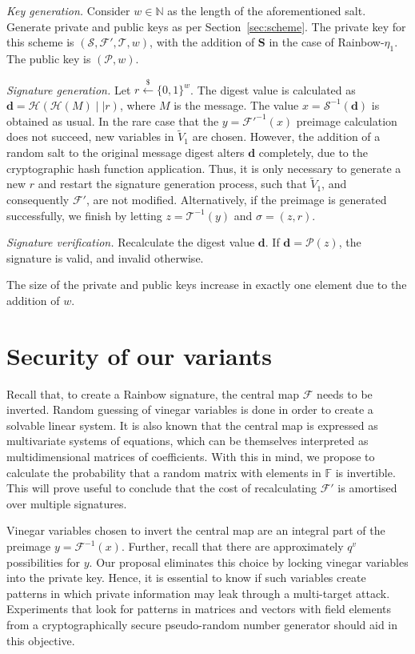\documentclass[openright, draft, 10pt]{report}
\newcommand{\random}{\stackrel{\$}{\longleftarrow}}
\begin{document}
\emph{Key generation.}
Consider $w \in \mathbb{N}$ as the length of the aforementioned salt. Generate
private and public keys as per Section~\ref{sec:scheme}. The private key
for this scheme is $(\mathcal{S}, \mathcal{F}', \mathcal{T}, w)$, with the
addition of $\mathbf{S}$ in the case of Rainbow-$\eta_{1}$. The public key is
$(\mathcal{P}, w)$.

\emph{Signature generation.}
Let $r \random{} {\{0, 1\}}^{w}$. The digest value is calculated as
$\mathbf{d} = \mathcal{H}(\mathcal{H}(M) \mid\mid r)$, where $M$ is the
message. The value $x = \mathcal{S}^{-1}(\mathbf{d})$ is obtained as usual. In
the rare case that the $y = \mathcal{F}'^{-1}(x)$ preimage calculation does not
succeed, new variables in $\widetilde{V}_{1}$ are chosen. However, the
addition of a random salt to the original message digest alters $\mathbf{d}$
completely, due to the cryptographic hash function application. Thus, it is
only necessary to generate a new $r$ and restart the signature generation
process, such that $\widetilde{V}_{1}$, and consequently $\mathcal{F}'$, are
not modified. Alternatively, if the preimage is generated successfully, we
finish by letting $z = \mathcal{T}^{-1}(y)$ and $\sigma = (z, r)$.

\emph{Signature verification.}
Recalculate the digest value $\mathbf{d}$. If $\mathbf{d} = \mathcal{P}(z)$,
the signature is valid, and invalid otherwise.

The size of the private and public keys increase in exactly one element due to
the addition of $w$.

\section{Security of our variants}\label{sec:security}

Recall that, to create a Rainbow signature, the central map $\mathcal{F}$ needs
to be inverted. Random guessing of vinegar variables is done in order to create
a solvable linear system. It is also known that the central map is expressed as
multivariate systems of equations, which can be themselves interpreted as
multidimensional matrices of coefficients. 
With this in mind, we propose to calculate the probability that a
random matrix with elements in $\mathbb{F}$ is invertible. This will prove useful
to conclude that the cost of recalculating $\mathcal{F}'$ is amortised over
multiple signatures.

Vinegar variables chosen to invert the central map are an integral part of the
preimage $y = \mathcal{F}^{-1}(x)$. 
Further, recall that there are approximately $q^v$ possibilities for $y$. Our
proposal eliminates this choice by locking vinegar variables into the private
key. Hence, it is essential to know if such variables create patterns in which
private information may leak through a multi-target attack. Experiments that
look for patterns in matrices and vectors with field elements from a
cryptographically secure pseudo-random number generator should aid in this objective.
\end{document}
